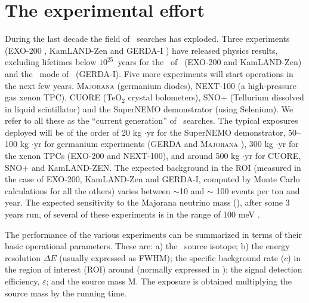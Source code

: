 \section{The experimental effort}\label{sec:experiments}

During the last decade the field of \bbonu\ searches has exploded. Three experiments (EXO-200 \cite{Albert:2014awa, Auger:2012ar}, KamLAND-Zen \cite{Asakura:2014lma, Gando:2012zm} and GERDA-I \cite{Agostini:2013mzu}) have released physics results, excluding  lifetimes below $10^{25}$~years for the \bbonu\ of \XE\ (EXO-200 and KamLAND-Zen) and the \bbonu\ mode of \GE\ (GERDA-I). 
Five more experiments will start operations in the next few years.  {\scshape Majorana} \cite{Abgrall:2013rze}(germanium diodes), NEXT-100 \cite{Gomez-Cadenas:2014dxa} (a high-pressure gas xenon TPC), CUORE  \cite{Giachero:2014hva} (TeO$_{2}$ crystal bolometers), SNO+ \cite{Biller:2014eha} (Tellurium  dissolved in liquid scintillator) and the SuperNEMO demonstrator \cite{Guzowski:2014ina} (using Selenium). We refer to all these as the
``current generation'' of \bbonu\ searches. The typical exposures deployed will be of the order of 20 kg $\cdot$yr for the SuperNEMO demonstrator, 50--100 kg $\cdot$yr for germanium experiments (GERDA and  {\scshape Majorana} ), 300 kg $\cdot$yr for the xenon TPCs (EXO-200 and NEXT-100), and around 500 kg $\cdot$yr for CUORE, SNO+ and KamLAND-ZEN. The expected background in the ROI (measured in the case of 
EXO-200, KamLAND-Zen and GERDA-I, computed by Monte Carlo calculations for all the others) varies between $\sim$10 and $\sim$ 100 events per ton and year. The expected sensitivity to the Majorana neutrino mass (\mbb), after some 3 years run, of several of these experiments is in the range of 100 meV \cite{Gomez-Cadenas:2015twa}.

The performance of the various experiments can be summarized in terms of their basic operational parameters. These are: a) the \bb\ source isotope; b) the energy resolution $\Delta E$ (usually expressed as FWHM); the specific background rate ($c$) in the region of interest (ROI) around \Qbb (normally expressed in \ckky); the signal detection efficiency, $\varepsilon$; and the source mass M. The exposure is obtained multiplying the source mass by the running time. 

